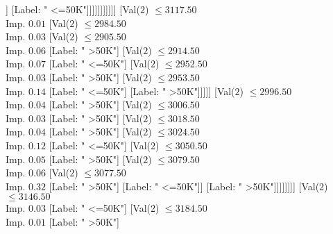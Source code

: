 \documentclass[margin=10pt]{standalone}
\begin{document}
\begin{forest}
																														[Val($2$) $ \leq 2835.50$ \\ Imp. $0.01$
																															[Val($2$) $ \leq 2828.50$ \\ Imp. $0.19$
																																[Label: " <=50K"]
																																[Label: " >50K"]]
																															[Label: " <=50K"]]]]]]]]]]]
																					[Val($2$) $ \leq 3117.50$ \\ Imp. $0.01$
																						[Val($2$) $ \leq 2984.50$ \\ Imp. $0.03$
																							[Val($2$) $ \leq 2905.50$ \\ Imp. $0.06$
																								[Label: " >50K"]
																								[Val($2$) $ \leq 2914.50$ \\ Imp. $0.07$
																									[Label: " <=50K"]
																									[Val($2$) $ \leq 2952.50$ \\ Imp. $0.03$
																										[Label: " >50K"]
																										[Val($2$) $ \leq 2953.50$ \\ Imp. $0.14$
																											[Label: " <=50K"]
																											[Label: " >50K"]]]]]
																							[Val($2$) $ \leq 2996.50$ \\ Imp. $0.04$
																								[Label: " >50K"]
																								[Val($2$) $ \leq 3006.50$ \\ Imp. $0.03$
																									[Label: " >50K"]
																									[Val($2$) $ \leq 3018.50$ \\ Imp. $0.04$
																										[Label: " >50K"]
																										[Val($2$) $ \leq 3024.50$ \\ Imp. $0.12$
																											[Label: " <=50K"]
																											[Val($2$) $ \leq 3050.50$ \\ Imp. $0.05$
																												[Label: " >50K"]
																												[Val($2$) $ \leq 3079.50$ \\ Imp. $0.06$
																													[Val($2$) $ \leq 3077.50$ \\ Imp. $0.32$
																														[Label: " >50K"]
																														[Label: " <=50K"]]
																													[Label: " >50K"]]]]]]]]
																						[Val($2$) $ \leq 3146.50$ \\ Imp. $0.03$
																							[Label: " <=50K"]
																							[Val($2$) $ \leq 3184.50$ \\ Imp. $0.01$
																								[Label: " >50K"]

\end{forest}
\end{document}
